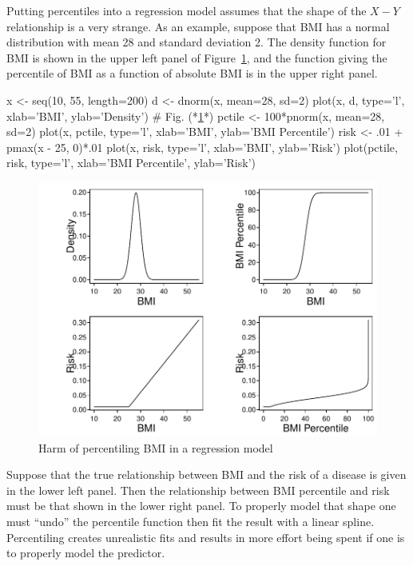 Putting percentiles into a regression model assumes that the shape of
the $X-Y$ relationship is a very strange.  As an example, suppose that
BMI has a normal distribution with mean 28 and standard deviation 2.
The density function for BMI is shown in the upper left panel of
Figure~\ref{fig:reg-bmi}, and the function giving the percentile of
BMI as a function of absolute BMI is in the upper right panel.
\begin{Schunk}
\begin{Sinput}
x <- seq(10, 55, length=200)
d <- dnorm(x, mean=28, sd=2)
plot(x, d, type='l', xlab='BMI', ylab='Density')   # Fig. (*\ref{fig:reg-bmi}*)
pctile <- 100*pnorm(x, mean=28, sd=2)
plot(x, pctile, type='l', xlab='BMI', ylab='BMI Percentile')
risk <- .01 + pmax(x - 25, 0)*.01
plot(x, risk, type='l', xlab='BMI', ylab='Risk')
plot(pctile, risk, type='l', xlab='BMI Percentile', ylab='Risk')
\end{Sinput}
\begin{figure}[htbp]

\centerline{\includegraphics{reg-bmi-1} }

\caption[Harm of percentiling BMI in a regression model]{Harm of percentiling BMI in a regression model}\label{fig:reg-bmi}
\end{figure}
\end{Schunk}
Suppose that the true relationship between BMI and the risk of a
disease is given in the lower left panel.  Then the relationship
between BMI percentile and risk must be that shown in the lower right
panel.  To properly model that shape one must ``undo'' the percentile
function then fit the result with a linear spline.  Percentiling
creates unrealistic fits and results in more effort being spent if one
is to properly model the predictor.

